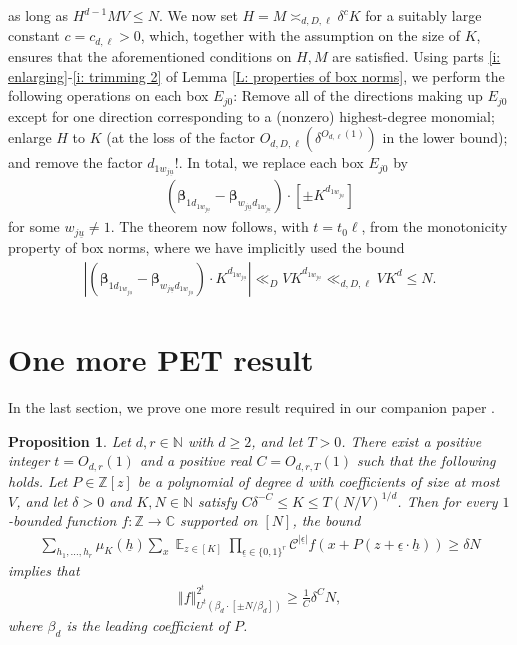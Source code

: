 \documentclass[11pt]{amsart}
\newtheorem{proposition}[lemma]{Proposition}
\theoremstyle{definition}
\DeclareMathOperator*{\E}{\mathbb{E}}
\newcommand{\C}{{\mathbb C}}
\newcommand{\N}{{\mathbb N}}
\newcommand{\Z}{{\mathbb Z}}
\newcommand{\CC}{{\mathcal C}}
\newcommand{\bbeta}{{\boldsymbol{\beta}}}
\newcommand{\uh}{{\underline{h}}}
\newcommand{\uu}{{\underline{u}}}
\newcommand{\ueps}{{\underline{\epsilon}}}
\newcommand{\norm}[1]{\left\Vert #1\right\Vert}
\begin{document}
    as long as $H^{d-1} M V \leq N$.  We now set $H = M \asymp_{d, D, \ell} \delta^{c}K$ for a suitably large constant $c=c_{d,\ell}>0$,
which, together with the assumption on the size of $K$, ensures that the aforementioned conditions on $H,M$ are satisfied.  Using parts \eqref{i: enlarging}-\eqref{i: trimming 2} of Lemma \ref{L: properties of box norms}, we perform the following operations on each box $E_{j0}$: Remove all of the directions making up $E_{j0}$ except for one direction corresponding to a (nonzero) highest-degree monomial; enlarge $H$ to $K$ (at the loss of the factor $O_{d, D, \ell}(\delta^{O_{d, \ell}(1)})$ in the lower bound); and remove the factor $d_{1w_{j\uu}}!$.  In total, we replace each box $E_{j0}$ by
    \begin{align*}
        (\bbeta_{1d_{1w_{j\uu}}}-\bbeta_{w_{j\uu}d_{1w_{j\uu}}})\cdot [\pm K^{d_{1w_{j\uu}}}]
    \end{align*}
    for some $w_{j\uu}\neq 1$. The theorem now follows, with $t=t_0\ell$, from the monotonicity property of box norms, where we have implicitly used the bound
    \begin{align*}
        |        (\bbeta_{1d_{1w_{j\uu}}}-\bbeta_{w_{j\uu}d_{1w_{j\uu}}})\cdot K^{d_{1w_{j\uu}}}|\ll_D V K^{d_{1w_{j\uu}}} \ll_{d, D, \ell} V K^d \leq N.
    \end{align*}

\section{One more PET result}\label{S: one more PET}

In the last section, we prove one more result required in our companion paper \cite{KKL24b}.
\begin{proposition}
    Let $d,r\in\N$ with $d\geq 2$, and let $T>0$.  There exist a positive integer $t = O_{d,r}(1)$ and a positive real $C=O_{d,r,T}(1)$ such that the following holds. Let $P\in\Z[z]$ be a polynomial of degree $d$ with coefficients of size at most $V$, and let $\delta>0$ and $K,N\in\N$ satisfy $C\delta^{-C}\leq K\leq T (N/V)^{1/d}$.  Then for every $1$-bounded function $f:\Z\to\C$ supported on $[N]$, the bound
    \begin{align}\label{E: average in one more PET}
        \sum_{h_1, \ldots, h_r}\mu_K(\uh)\sum_x \E_{z\in[K]} \prod_{\ueps\in\{0,1\}^{r}}\CC^{|\ueps|}f(x + P(z+\ueps\cdot\uh)) \geq \delta N
    \end{align}
    implies that
    \begin{align*}
    \norm{f}_{U^t(\beta_d\cdot[\pm N/\beta_d])}^{2^{t}}\geq \frac{1}{C} \delta^{C} N,
\end{align*}
where $\beta_d$ is the leading coefficient of $P$.
\end{proposition}
\end{document}
